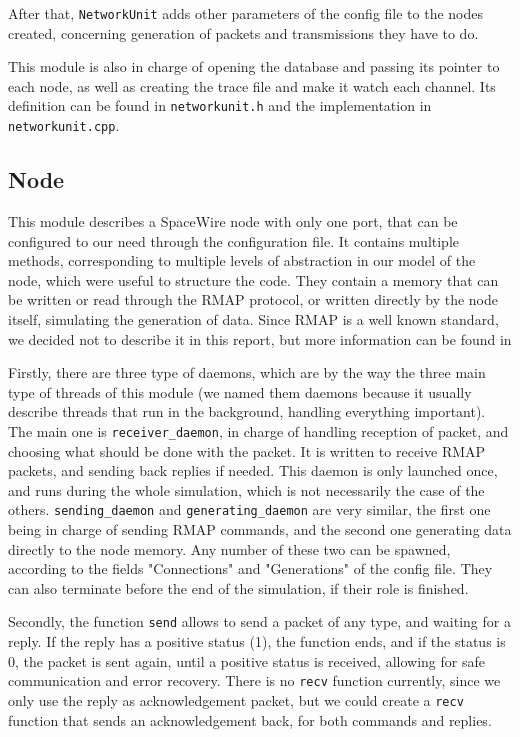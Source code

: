 \documentclass[12pt,a4paper]{article}
\begin{document}
After that, \texttt{NetworkUnit} adds other parameters of the config file to the nodes created, concerning generation of packets and transmissions they have to do.

This module is also in charge of opening the database and passing its pointer to each node, as well as creating the trace file and make it watch each channel. Its definition can be found in \texttt{networkunit.h} and the implementation in \texttt{networkunit.cpp}.

\subsection{Node}
\label{ssec:Node}
This module describes a SpaceWire node with only one port, that can be configured to our need through the configuration file. It contains multiple methods, corresponding to multiple levels of abstraction in our model of the node, which were useful to structure the code. They contain a memory that can be written or read through the RMAP protocol, or written directly by the node itself, simulating the generation of data. Since RMAP is a well known standard, we decided not to describe it in this report, but more information can be found in \cite{RMAP}\medbreak

Firstly, there are three type of daemons, which are by the way the three main type of threads of this module (we named them daemons because it usually describe threads that run in the background, handling everything important). The main one is \texttt{receiver\_daemon}, in charge of handling reception of packet, and choosing what should be done with the packet. It is written to receive RMAP packets, and sending back replies if needed. This daemon is only launched once, and runs during the whole simulation, which is not necessarily the case of the others. \texttt{sending\_daemon} and \texttt{generating\_daemon} are very similar, the first one being in charge of sending RMAP commands, and the second one generating data directly to the node memory. Any number of these two can be spawned, according to the fields "Connections" and "Generations" of the config file. They can also terminate before the end of the simulation, if their role is finished.

Secondly, the function \texttt{send} allows to send a packet of any type, and waiting for a reply. If the reply has a positive status (1), the function ends, and if the status is 0, the packet is sent again, until a positive status is received, allowing for safe communication and error recovery. There is no \texttt{recv} function currently, since we only use the reply as acknowledgement packet, but we could create a \texttt{recv} function that sends an acknowledgement back, for both commands and replies.
\end{document}
